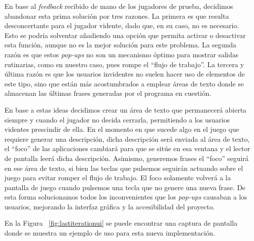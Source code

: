 En base al \textit{feedback} recibido de mano de los jugadores de prueba, decidimos abandonar esta prima solución por tres razones. La primera es que resulta desconcertante para el jugador vidente, dado que, en su caso, no es necesario. Esto se podría solventar añadiendo una opción que permita activar o desactivar esta función, aunque no es la mejor solución para este problema.
La segunda razón es que estos \textit{pop-ups} no son un mecanismo óptimo para mostrar salidas rutinarias, como en nuestro caso, pues rompe el ``flujo de trabajo''.
La tercera y última razón es que los usuarios invidentes no suelen hacer uso de elementos de este tipo, sino que están más acostumbrados a emplear áreas de texto donde se almacenan las últimas frases generadas por el programa en cuestión.

En base a estas ideas decidimos crear un área de texto que permanecerá abierta siempre y cuando el jugador no decida cerrarla, permitiendo a los usuarios videntes prescindir de ella. En el momento en que sucede algo en el juego que requiere generar una descripción, dicha descripción será enviada al área de texto, el ``foco'' de las aplicaciones cambiará para que se sitúe en esa ventana y el lector de pantalla leerá dicha descripción. Asimismo, generemos frases el ``foco'' seguirá en ese área de texto, si bien las teclas que pulsemos seguirán actuando sobre el juego para evitar romper el flujo de trabajo. El foco solamente volverá a la pantalla de juego cuando pulsemos una tecla que no genere una nueva frase.
De esta forma solucionamos todos los inconvenientes que los \textit{pop-ups} causaban a los usuarios, mejorando la interfaz gráfica y la accesibilidad del proyecto.

En la Figura ~\ref{fig:lastiterationui} se puede encontrar una captura de pantalla donde se muestra un ejemplo de uso para esta nueva implementación.

